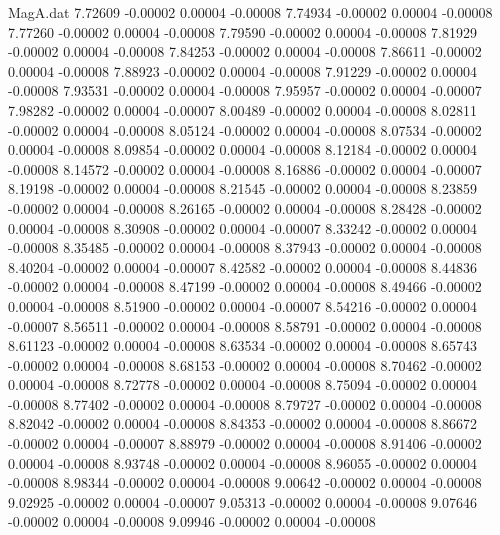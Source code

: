 \begin{filecontents}{MagA.dat}
   7.72609   -0.00002    0.00004   -0.00008
   7.74934   -0.00002    0.00004   -0.00008
   7.77260   -0.00002    0.00004   -0.00008
   7.79590   -0.00002    0.00004   -0.00008
   7.81929   -0.00002    0.00004   -0.00008
   7.84253   -0.00002    0.00004   -0.00008
   7.86611   -0.00002    0.00004   -0.00008
   7.88923   -0.00002    0.00004   -0.00008
   7.91229   -0.00002    0.00004   -0.00008
   7.93531   -0.00002    0.00004   -0.00008
   7.95957   -0.00002    0.00004   -0.00007
   7.98282   -0.00002    0.00004   -0.00007
   8.00489   -0.00002    0.00004   -0.00008
   8.02811   -0.00002    0.00004   -0.00008
   8.05124   -0.00002    0.00004   -0.00008
   8.07534   -0.00002    0.00004   -0.00008
   8.09854   -0.00002    0.00004   -0.00008
   8.12184   -0.00002    0.00004   -0.00008
   8.14572   -0.00002    0.00004   -0.00008
   8.16886   -0.00002    0.00004   -0.00007
   8.19198   -0.00002    0.00004   -0.00008
   8.21545   -0.00002    0.00004   -0.00008
   8.23859   -0.00002    0.00004   -0.00008
   8.26165   -0.00002    0.00004   -0.00008
   8.28428   -0.00002    0.00004   -0.00008
   8.30908   -0.00002    0.00004   -0.00007
   8.33242   -0.00002    0.00004   -0.00008
   8.35485   -0.00002    0.00004   -0.00008
   8.37943   -0.00002    0.00004   -0.00008
   8.40204   -0.00002    0.00004   -0.00007
   8.42582   -0.00002    0.00004   -0.00008
   8.44836   -0.00002    0.00004   -0.00008
   8.47199   -0.00002    0.00004   -0.00008
   8.49466   -0.00002    0.00004   -0.00008
   8.51900   -0.00002    0.00004   -0.00007
   8.54216   -0.00002    0.00004   -0.00007
   8.56511   -0.00002    0.00004   -0.00008
   8.58791   -0.00002    0.00004   -0.00008
   8.61123   -0.00002    0.00004   -0.00008
   8.63534   -0.00002    0.00004   -0.00008
   8.65743   -0.00002    0.00004   -0.00008
   8.68153   -0.00002    0.00004   -0.00008
   8.70462   -0.00002    0.00004   -0.00008
   8.72778   -0.00002    0.00004   -0.00008
   8.75094   -0.00002    0.00004   -0.00008
   8.77402   -0.00002    0.00004   -0.00008
   8.79727   -0.00002    0.00004   -0.00008
   8.82042   -0.00002    0.00004   -0.00008
   8.84353   -0.00002    0.00004   -0.00008
   8.86672   -0.00002    0.00004   -0.00007
   8.88979   -0.00002    0.00004   -0.00008
   8.91406   -0.00002    0.00004   -0.00008
   8.93748   -0.00002    0.00004   -0.00008
   8.96055   -0.00002    0.00004   -0.00008
   8.98344   -0.00002    0.00004   -0.00008
   9.00642   -0.00002    0.00004   -0.00008
   9.02925   -0.00002    0.00004   -0.00007
   9.05313   -0.00002    0.00004   -0.00008
   9.07646   -0.00002    0.00004   -0.00008
   9.09946   -0.00002    0.00004   -0.00008

\end{filecontents}

